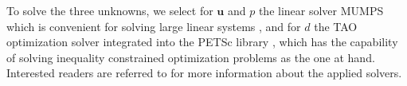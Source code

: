 To solve the three unknowns, we select for $\bm{u}$ and $p$ the linear solver MUMPS which is convenient for solving large linear systems \cite{amestoy2000mumps}, and for $d$ the TAO optimization solver integrated into the PETSc library \cite{munson2014toolkit, petsc-user-ref}, which has the capability of solving inequality constrained optimization problems as the one at hand. Interested readers are referred to \cite{bilgen2018phase} for more information about the applied solvers.


